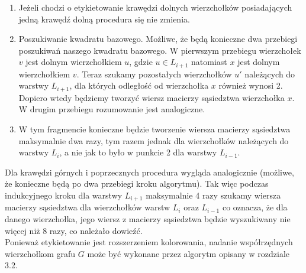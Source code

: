 \documentclass[12pt,a4paper,titlepage]{article}
\begin{document}
\begin{enumerate}
\item 
Jeżeli chodzi o etykietowanie krawędzi dolnych wierzchołków posiadających jedną krawędź dolną procedura się nie zmienia.
\item
Poszukiwanie kwadratu bazowego. Możliwe, że będą konieczne dwa przebiegi poszukiwań naszego kwadratu bazowego. W pierwszym przebiegu wierzchołek $v$ jest dolnym wierzchołkiem $u$, gdzie $u \in L_{i+1}$ natomiast $x$ jest dolnym wierzchołkiem $v$. Teraz szukamy pozostałych wierzchołków $u'$ należących do warstwy $L_{i+1}$, dla których odległość od wierzchołka $x$ również wynosi 2. Dopiero wtedy będziemy tworzyć wiersz macierzy sąsiedztwa wierzchołka $x$. W drugim przebiegu rozumowanie jest analogiczne. 
\item
W tym fragmencie konieczne będzie tworzenie wiersza macierzy sąsiedztwa maksymalnie dwa razy, tym razem jednak dla wierzchołków należących do warstwy $L_i$, a nie jak to było w punkcie 2 dla warstwy $L_{i-1}$.
\end{enumerate}
Dla krawędzi górnych i poprzecznych procedura wygląda analogicznie (możliwe, że konieczne będą po dwa przebiegi kroku algorytmu). Tak więc podczas indukcyjnego kroku dla warstwy $L_{i+1}$ maksymalnie 4 razy szukamy wiersza macierzy sąsiedztwa dla wierzchołków warstw $L_{i} $ oraz $L_{i-1}$ co oznacza, że dla danego wierzchołka, jego wiersz z macierzy sąsiedztwa będzie wyszukiwany nie więcej niż 8 razy, co należało dowieźć. \\

Ponieważ etykietowanie jest rozszerzeniem kolorowania, nadanie współrzędnych wierzchołkom grafu $G$ może być wykonane przez algorytm opisany w rozdziale 3.2.\\
\newpage
\end{document}
